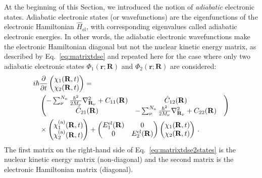 \documentclass[9pt,bestpractices,pubversion]{livecoms}
\newcommand{\bs}{\mathbf}
\begin{document}
At the beginning of this Section, we introduced the notion of \textit{adiabatic} electronic states. Adiabatic electronic states (or wavefunctions) are the eigenfunctions of the electronic Hamiltonian $\hat{H}_{\text{el}}$, with corresponding eigenvalues called adiabatic electronic energies. In other words, the adiabatic electronic wavefunctions make the electronic Hamiltonian diagonal but not the nuclear kinetic energy matrix, as described by Eq.~\ref{eq:matrixtdse} and repeated here for the case where only two adiabatic electronic states $\Phi_1(\bs r; \bs R)$ and $\Phi_2(\bs r; \bs R)$ are considered:
\begin{align} 
 i\hbar & \frac{\partial}{\partial t} 
     \begin{pmatrix}
        \chi_1(\mathbf{R},t)  \\
        \chi_2(\mathbf{R},t) \\
    \end{pmatrix} =  \notag \\
   & \begin{pmatrix}
        -\sum_\nu^{N_{\text{n}}}\frac{\hbar^2}{2M_\nu} \nabla_{\mathbf{R}_\nu}^2 + C_{11}(\mathbf{R})  & \hat{C}_{12}(\mathbf{R})  \\
        \hat{C}_{21}(\mathbf{R}) & -\sum_\nu^{N_{\text{n}}}\frac{\hbar^2}{2M_\nu} \nabla_{\mathbf{R}_\nu}^2 + C_{22}(\mathbf{R}) & \\
    \end{pmatrix}  \notag \\
    & \times \begin{pmatrix}
        \chi_1^{\text{(a)}}(\mathbf{R},t)  \\
        \chi_2^{\text{(a)}}(\mathbf{R},t) \\
    \end{pmatrix} + 
    \begin{pmatrix}
        E^{\text{el}}_{1}(\mathbf{R})   & 0  \\
        0 & E^{\text{el}}_{2}(\mathbf{R})    \\
    \end{pmatrix} 
    \begin{pmatrix}
        \chi_1(\mathbf{R},t)  \\
        \chi_2(\mathbf{R},t) \\
    \end{pmatrix}
    \, .
\label{eq:matrixtdse2states}
\end{align}
The first matrix on the right-hand side of Eq.~\eqref{eq:matrixtdse2states} is the nuclear kinetic energy matrix (non-diagonal) and the second matrix is the electronic Hamiltonian matrix (diagonal).
\end{document}
